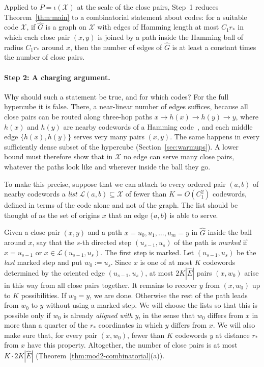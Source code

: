 \documentclass[11pt]{article}
\theoremstyle{definition}
\theoremstyle{remark}
\begin{document}
Applied to $P = \iota(\mathcal{X})$ at the scale of the close pairs, Step~1 reduces Theorem~\ref{thm:main} to a combinatorial statement about codes: for a suitable code $\mathcal{X}$, if $\widehat{G}$ is a graph on $\mathcal{X}$ with edges of Hamming length at most $C_1 r_*$ in which each close pair $(x, y)$ is joined by a path inside the Hamming ball of radius $C_1 r_*$ around $x$, then the number of edges of $\widehat{G}$ is at least a constant times the number of close pairs.

\paragraph{Step 2: A charging argument.}
Why should such a statement be true, and for which codes? For the full hypercube it is false. There, a near-linear number of edges suffices, because all close pairs can be routed along three-hop paths $x \to h(x) \to h(y) \to y$, where $h(x)$ and $h(y)$ are nearby codewords of a Hamming code~\cite{krauthgamer2026towards}, and each middle edge $\{h(x), h(y)\}$ serves very many pairs $(x, y)$. The same happens in every sufficiently dense subset of the hypercube (Section~\ref{sec:warmups}). A lower bound must therefore show that in $\mathcal{X}$ no edge can serve many close pairs, whatever the paths look like and wherever inside the ball they go.

To make this precise, suppose that we can attach to every ordered pair $(a, b)$ of nearby codewords a \emph{list} $\mathcal{L}(a, b) \subseteq \mathcal{X}$ of fewer than $K = O(C_1^2)$ codewords, defined in terms of the code alone and not of the graph. The list should be thought of as the set of origins $x$ that an edge $\{a, b\}$ is able to serve.

Given a close pair $(x, y)$ and a path $x = u_0, u_1, \dots, u_m = y$ in $\widehat{G}$ inside the ball around $x$, say that the $s$-th directed step $(u_{s-1}, u_s)$ of the path is \emph{marked} if $x = u_{s-1}$ or $x \in \mathcal{L}(u_{s-1}, u_s)$. The first step is marked. Let $(u_{s-1}, u_s)$ be the \emph{last} marked step and put $w_0 := u_s$. Since $x$ is one of at most $K$ codewords determined by the oriented edge $(u_{s-1}, u_s)$, at most $2 K |\widehat{E}|$ pairs $(x, w_0)$ arise in this way from all close pairs together. It remains to recover $y$ from $(x, w_0)$ up to $K$ possibilities. If $w_0 = y$, we are done. Otherwise the rest of the path leads from $w_0$ to $y$ without using a marked step. We will choose the lists so that this is possible only if $w_0$ is already \emph{aligned with} $y$, in the sense that $w_0$ differs from $x$ in more than a quarter of the $r_*$ coordinates in which $y$ differs from $x$. We will also make sure that, for every pair $(x, w_0)$, fewer than $K$ codewords $y$ at distance $r_*$ from $x$ have this property. Altogether, the number of close pairs is at most $K \cdot 2 K |\widehat{E}|$ (Theorem~\ref{thm:mod2-combinatorial}(a)).
\end{document}
